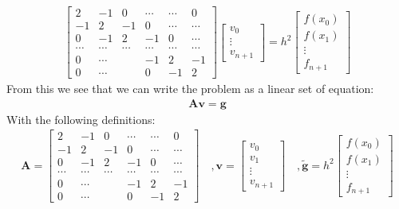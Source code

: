 \documentclass[american,a4paper,12pt]{article}
\renewcommand{\vec}[1]{\mathbf{#1}} %
\begin{document}
  \begin{align*}
        \begin{bmatrix}
          2 & -1 & 0 & \cdots & \cdots & 0 \\
          -1 & 2 & -1 & 0 & \cdots & \cdots \\
          0 & -1 & 2 & -1 & 0 & \cdots \\
          \cdots & \cdots & \cdots & \cdots & \cdots & \cdots \\
          0 & \cdots & & -1 & 2 & -1 \\
          0 & \cdots & & 0 & -1 & 2
        \end{bmatrix}
        \begin{bmatrix}
          v_0 \\
          \vdots \\
          v_{n+1}
        \end{bmatrix}
  = h^2
        \begin{bmatrix}
          f(x_0) \\
          f(x_1) \\
          \vdots \\
          f_{n+1}
        \end{bmatrix}
  \end{align*}
  From this we see that we can write the problem as a linear set of equation:
  \begin{align*}
    \vec{A}\vec{v} = \vec{g}
  \end{align*}
  With the following definitions:
  \begin{align*}
    \vec{A} =
    \begin{bmatrix}
      2 & -1 & 0 & \cdots & \cdots & 0 \\
      -1 & 2 & -1 & 0 & \cdots & \cdots \\
      0 & -1 & 2 & -1 & 0 & \cdots \\
      \cdots & \cdots & \cdots & \cdots & \cdots & \cdots \\
      0 & \cdots & & -1 & 2 & -1 \\
      0 & \cdots & & 0 & -1 & 2
    \end{bmatrix}
    \quad, \vec{v} =
    \begin{bmatrix}
      v_0 \\
      v_1 \\
      \vdots \\
      v_{n+1}
    \end{bmatrix}
    \quad, \vec{\tilde{g}} = h^2
    \begin{bmatrix}
      f(x_0) \\
      f(x_1) \\
      \vdots \\
      f_{n+1}
    \end{bmatrix}
  \end{align*}
\end{document}
